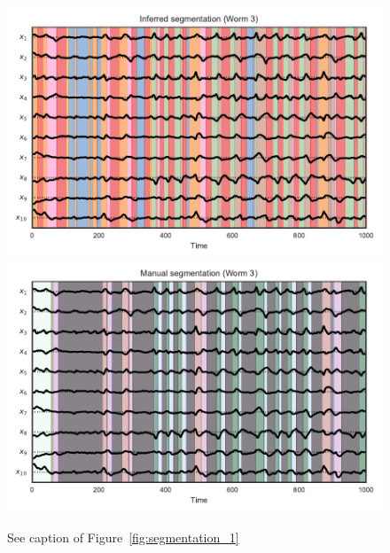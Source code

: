 \documentclass{article}
\begin{document}
\begin{figure}[h]
\centering%
\includegraphics[width=5.5in]{figures/arhmm/x_segmentation_2.pdf}
\includegraphics[width=5.5in]{figures/arhmm/x_segmentation_zimmer_2.pdf}
\caption{See caption of Figure~\ref{fig:segmentation_1}}
\label{fig:segmentation_3}
\end{figure}
\end{document}
